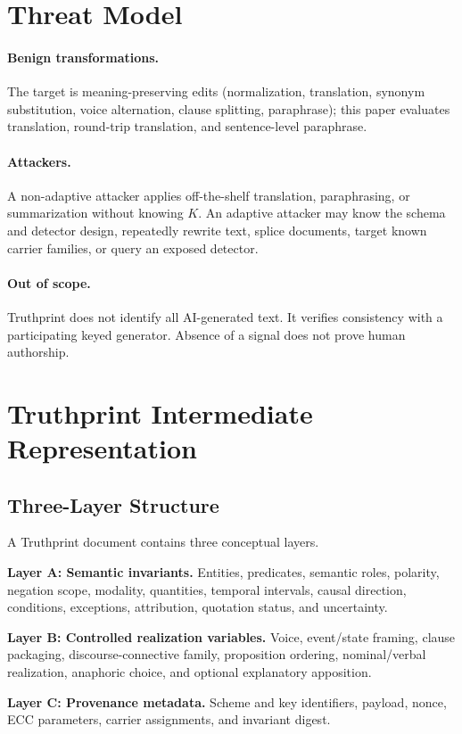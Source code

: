 \documentclass[11pt]{article}
\begin{document}
\section{Threat Model}
\paragraph{Benign transformations.} The target is meaning-preserving edits (normalization, translation, synonym substitution, voice alternation, clause splitting, paraphrase); this paper evaluates translation, round-trip translation, and sentence-level paraphrase.

\paragraph{Attackers.} A non-adaptive attacker applies off-the-shelf translation, paraphrasing, or summarization without knowing $K$. An adaptive attacker may know the schema and detector design, repeatedly rewrite text, splice documents, target known carrier families, or query an exposed detector.

\paragraph{Out of scope.} Truthprint does not identify all AI-generated text. It verifies consistency with a participating keyed generator. Absence of a signal does not prove human authorship.

\section{Truthprint Intermediate Representation}
\subsection{Three-Layer Structure}
A Truthprint document contains three conceptual layers.

\textbf{Layer A: Semantic invariants.} Entities, predicates, semantic roles, polarity, negation scope, modality, quantities, temporal intervals, causal direction, conditions, exceptions, attribution, quotation status, and uncertainty.

\textbf{Layer B: Controlled realization variables.} Voice, event/state framing, clause packaging, discourse-connective family, proposition ordering, nominal/verbal realization, anaphoric choice, and optional explanatory apposition.

\textbf{Layer C: Provenance metadata.} Scheme and key identifiers, payload, nonce, ECC parameters, carrier assignments, and invariant digest.
\end{document}

